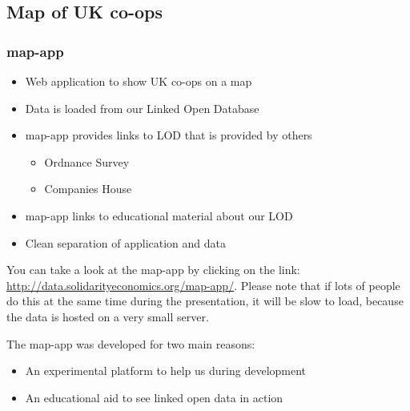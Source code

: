 \subsection{Map of UK co-ops}
\startslide
\frame
{
  \frametitle{map-app}
  \begin{itemize}
    \item<1-> Web application to show UK co-ops on a map
    \item<2-> Data is loaded from our Linked Open Database
    \item<3-> map-app provides links to LOD that is provided by others
      \begin{itemize}
	\item<3-> Ordnance Survey
	\item<3-> Companies House
      \end{itemize}
    \item<4-> map-app links to educational material about our LOD
    \item<article> Clean separation of application and data
  \end{itemize}
}
\slideend

You can take a look at the map-app by clicking on the link: \url{http://data.solidarityeconomics.org/map-app/}.
Please note that if lots of people do this at the same time during the presentation, it will be slow to load, because the data is hosted on a very small server.

The map-app was developed for two main reasons:
  \begin{itemize}
    \item An experimental platform to help us during development
    \item An educational aid to see linked open data in action 
  \end{itemize}

